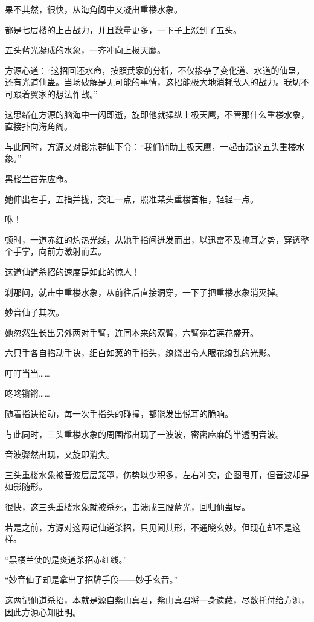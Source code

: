 \begin{this_body}
果不其然，很快，从海角阁中又凝出重楼水象。

都是七层楼的上古战力，并且数量更多，一下子上涨到了五头。

五头蓝光凝成的水象，一齐冲向上极天鹰。

方源心道：“这招回还水命，按照武家的分析，不仅掺杂了变化道、水道的仙蛊，还有光道仙蛊。当场破解是无可能的事情，这招能极大地消耗敌人的战力。我切不可跟着翼家的想法作战。”

这思绪在方源的脑海中一闪即逝，旋即他就操纵上极天鹰，不管那什么重楼水象，直接扑向海角阁。

与此同时，方源又对影宗群仙下令：“我们辅助上极天鹰，一起击溃这五头重楼水象。”

黑楼兰首先应命。

她伸出右手，五指并拢，交汇一点，照准某头重楼首相，轻轻一点。

咻！

顿时，一道赤红的灼热光线，从她手指间迸发而出，以迅雷不及掩耳之势，穿透整个手掌，向前方激射而去。

这道仙道杀招的速度是如此的惊人！

刹那间，就击中重楼水象，从前往后直接洞穿，一下子把重楼水象消灭掉。

妙音仙子其次。

她忽然生长出另外两对手臂，连同本来的双臂，六臂宛若莲花盛开。

六只手各自掐动手诀，细白如葱的手指头，缭绕出令人眼花缭乱的光影。

叮叮当当……

咚咚锵锵……

随着指诀掐动，每一次手指头的碰撞，都能发出悦耳的脆响。

与此同时，三头重楼水象的周围都出现了一波波，密密麻麻的半透明音波。

音波骤然出现，又旋即消失。

三头重楼水象被音波层层笼罩，伤势以少积多，左右冲突，企图甩开，但音波却是如影随形。

很快，这三头重楼水象就被杀死，击溃成三股蓝光，回归仙蛊屋。

若是之前，方源对这两记仙道杀招，只见闻其形，不通晓玄妙。但现在却不是这样。

“黑楼兰使的是炎道杀招赤红线。”

“妙音仙子却是拿出了招牌手段——妙手玄音。”

这两记仙道杀招，本就是源自紫山真君，紫山真君将一身遗藏，尽数托付给方源，因此方源心知肚明。


\end{this_body}
